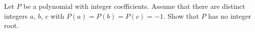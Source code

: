 Let $P$ be a polynomial with integer coefficients. Assume that there are distinct integers $a$, $b$, $c$ with $P(a) = P(b) = P(c) = -1$. Show that $P$ has no integer root.
